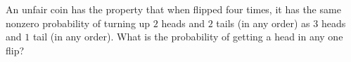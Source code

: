 An unfair coin has the property that when flipped four times, it has the same nonzero probability
of turning up $2$ heads and $2$ tails (in any order) as $3$ heads and $1$ tail (in any order). What is the probability of getting a head in any one flip?